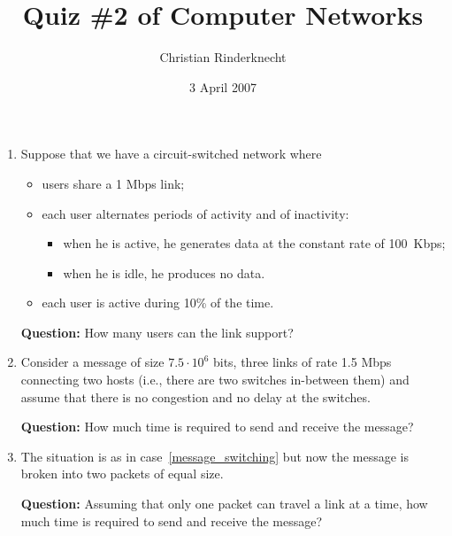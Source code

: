 \documentclass[11pt,a4paper]{article}
\title{Quiz \#2 of Computer Networks}
\author{Christian Rinderknecht}
\date{3 April 2007}
\begin{document}
\maketitle

\thispagestyle{empty}

\begin{enumerate}

  \item Suppose that we have a circuit-switched network where
    \begin{itemize}

      \item users share a 1 Mbps link;

      \item each user alternates periods of activity and of inactivity:
        \begin{itemize}

          \item when he is active, he generates data at the constant
            rate of 100~Kbps;

          \item when he is idle, he produces no data.

        \end{itemize}

      \item each user is active during 10\% of the time.

    \end{itemize}
    \textbf{Question:} How many users can the link support?

  \item \label{message_switching} Consider a message of size \(7.5
    \cdot 10^6\) bits, three links of rate 1.5 Mbps connecting two
    hosts (i.e., there are two switches in-between them) and assume
    that there is no congestion and no delay at the switches.

    \textbf{Question:} How much time is required to send and receive
    the message?

  \item The situation is as in case~\ref{message_switching} but now
    the message is broken into two packets of equal size. 

    \textbf{Question:} Assuming that only one packet can travel a link
    at a time, how much time is required to send and receive the
    message?


\end{enumerate}
\end{document}
